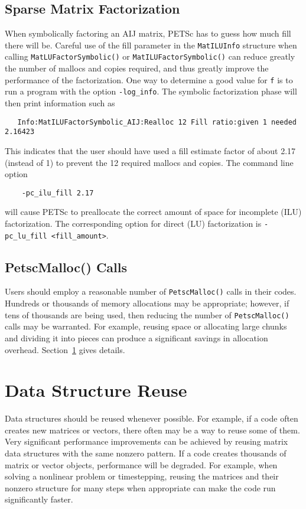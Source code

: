{\subsection{Sparse Matrix Factorization}
\label{sec:symbolfactor}

When symbolically factoring an AIJ matrix, PETSc has to guess
how much fill there will be.  Careful use of the fill parameter in the 
{\tt MatILUInfo} structure  
when calling {\tt MatLUFactorSymbolic()} or {\tt MatILUFactorSymbolic()}
can reduce greatly the number of mallocs and copies required, and thus
greatly improve the performance of the factorization.  One way to
determine a good value for {\tt f} is to run a program with the option {\tt -log\_info}.
The symbolic factorization phase will then print information such as
\begin{verbatim}
   Info:MatILUFactorSymbolic_AIJ:Realloc 12 Fill ratio:given 1 needed 2.16423
\end{verbatim}
This indicates that the user should have used a fill estimate factor of
about 2.17 (instead of 1) to prevent the 12 required mallocs and copies.
The command line option   
\begin{verbatim}
    -pc_ilu_fill 2.17
\end{verbatim}
will cause PETSc to preallocate the correct amount of space for incomplete
(ILU) factorization.  The corresponding option for direct (LU) factorization
is {\tt -pc\_lu\_fill <fill\_amount>}.

\subsection{PetscMalloc() Calls}
Users should employ a reasonable number of {\tt PetscMalloc()} calls in their codes.
Hundreds or thousands of memory allocations may be appropriate; however, if tens of 
thousands are being used, then reducing the number of {\tt PetscMalloc()} calls
may be warranted.  For example, reusing space or allocating large chunks 
and dividing it into pieces can produce a significant savings in 
allocation overhead.  Section~\ref{sec:dsreuse} gives details.

\section{Data Structure Reuse}
\label{sec:dsreuse}

Data structures should be reused whenever possible.  For example, if a code often
creates new matrices or vectors, there often may be a way to reuse some
of them.  Very significant performance improvements can be achieved by
reusing matrix data structures with the same nonzero pattern.  If a code
creates thousands of matrix or vector objects, performance will be
degraded.  For example, when solving a nonlinear problem or timestepping,
reusing the matrices and their nonzero structure for many steps when
 appropriate can make the code run significantly faster.  

}
